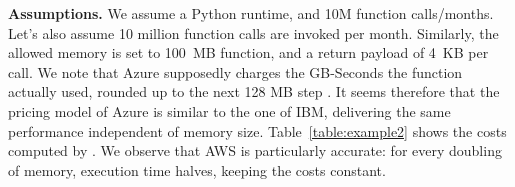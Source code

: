 %
\textbf{Assumptions.} We assume a Python runtime, and 10M function calls/months.
Let's also assume 10 million function calls are invoked per month. 
Similarly, the allowed memory is set to 100~\gls{MB} function, and a return payload of 4~KB per call.
We note that Azure supposedly charges the GB-Seconds the function actually used, rounded up to the next 128 \gls{MB} step \cite{AzurePricing}. 
It seems therefore that the pricing model of Azure is similar to the one of \gls{IBM}, delivering the same performance independent of memory size.
Table~\ref{table:example2} shows the costs computed by \sys.
We observe that \gls{AWS} is particularly accurate: for every doubling of memory, execution time halves, keeping the costs constant.
